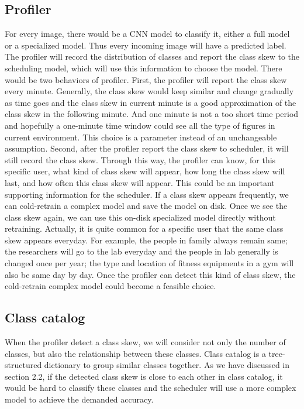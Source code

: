 \documentclass{article}
\begin{document}
\subsection{Profiler}
For every image, there would be a CNN model to classify it, either a full model or a specialized model. Thus every incoming image will have a predicted label. The profiler will record the distribution of classes and report the class skew to the scheduling model, which will use this information to choose the model. There would be two behaviors of profiler. First, the profiler will report the class skew every minute. Generally, the class skew would keep similar and change gradually as time goes and the class skew in current minute is a good approximation of the class skew in the following minute. And one minute is not a too short time period and hopefully a one-minute time window could see all the type of figures in current environment. This choice is a parameter instead of an unchangeable assumption. Second, after the profiler report the class skew to scheduler, it will still record the class skew. Through this way, the profiler can know, for this specific user, what kind of class skew will appear, how long the class skew will last, and how often this class skew will appear. This could be an important supporting information for the scheduler. If a class skew appears frequently, we can cold-retrain a complex model and save the model on disk. Once we see the class skew again, we can use this on-disk specialized model directly without retraining. Actually, it is quite common for a specific user that the same class skew appears everyday. For example, the people in family always remain same; the researchers will go to the lab everyday and the people in lab generally is changed once per year; the type and location of fitness equipments in a gym will also be same day by day. Once the profiler can detect this kind of class skew, the cold-retrain complex model could become a feasible choice.

\subsection{Class catalog}
When the profiler detect a class skew, we will consider not only the number of classes, but also the relationship between these classes. Class catalog is a tree-structured dictionary to group similar classes together. As we have discussed in section 2.2, if the detected class skew is close to each other in class catalog, it would be hard to classify these classes and the scheduler will use a more complex model to achieve the demanded accuracy. 
\end{document}
